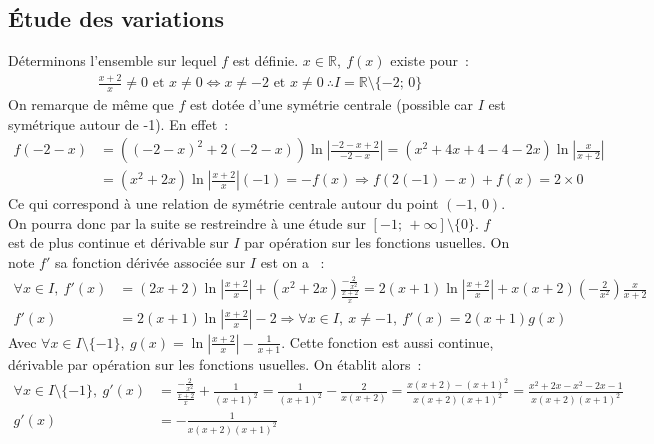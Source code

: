 \documentclass{article}
\begin{document}
  \subsection*{Étude des variations}
  Déterminons l'ensemble sur lequel $f$ est définie. $x\in\mathbb{R},\ f(x)$ existe pour~:
  \begin{align*}
    \frac{x + 2}{x} \neq 0 \text{ et } x \neq 0 \iff x \neq -2 \text{ et } x \neq 0\ \therefore I = \mathbb{R}\setminus\{-2;\, 0\}
  \end{align*}
  On remarque de même que $f$ est dotée d'une symétrie centrale (possible car $I$ est symétrique autour de -1). En effet~:
  \begin{align*}
    f(-2 - x) &= \left((-2 - x)^2 + 2(-2 - x)\right)\ln\left|\frac{-2 - x + 2}{-2 - x}\right|
    = (x^2 + 4x + 4 - 4 - 2x)\ln\left|\frac{x}{x + 2}\right| \\
    &= (x^2 + 2x)\ln\left|\frac{x + 2}{x}\right|(-1) = -f(x) \Longrightarrow f(2(-1) - x) + f(x) = 2 \times 0
  \end{align*}
  Ce qui correspond à une relation de symétrie centrale autour du point $(-1,\, 0)$. On pourra donc par la suite se restreindre à une étude sur $[-1;\, +\infty]\setminus\{0\}$. $f$ est de plus continue et dérivable sur $I$ par opération sur les fonctions usuelles. On note $f'$ sa fonction dérivée associée sur $I$ est on a ~:
  \begin{align*}
    \forall x\in I,\ f'(x) &= (2x + 2)\ln\left|\frac{x + 2}{x}\right| + (x^2 + 2x)\frac{-\frac{2}{x^2}}{\frac{x + 2}{x}} = 2(x + 1)\ln\left|\frac{x + 2}{x}\right| + x(x + 2)\left(-\frac{2}{x^2}\right)\frac{x}{x + 2} \\
    f'(x) &= 2(x + 1)\ln\left|\frac{x + 2}{x}\right| - 2 \Rightarrow \forall x\in I,\ x \neq -1,\ f'(x) = 2(x + 1)g(x)
  \end{align*}
  Avec $\forall x\in I\setminus\{-1\},\ g(x) = \ln\left|\frac{x + 2}{x}\right| - \frac{1}{x + 1}$. Cette fonction est aussi continue, dérivable par opération sur les fonctions usuelles. On établit alors~:
  \begin{align*}
    \forall x\in I\setminus\{-1\},\ g'(x) &= \frac{-\frac{2}{x^2}}{\frac{x + 2}{x}} + \frac{1}{(x + 1)^2}
    = \frac{1}{(x + 1)^2} - \frac{2}{x(x + 2)} = \frac{x(x + 2) - (x + 1)^2}{x(x + 2)(x + 1)^2}
    = \frac{x^2 + 2x - x^2 - 2x - 1}{x(x + 2)(x + 1)^2} \\
    g'(x) &= - \frac{1}{x(x + 2)(x + 1)^2}
  \end{align*}
\end{document}
